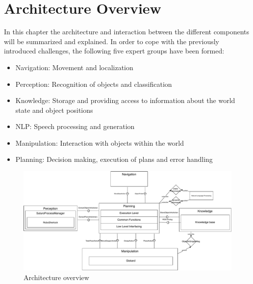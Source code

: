 \documentclass[main.tex]{subfiles}
\begin{document}
	\begingroup

	\renewcommand{\cleardoublepage}{}

	\renewcommand{\clearpage}{}
	
	\newpage

	\chapter{Architecture Overview}
		In this chapter the architecture and interaction between the different components will be summarized and explained.
		In order to cope with the previously introduced challenges, the following five expert groups have been formed:

		\begin{itemize}
			\item Navigation: Movement and localization
			\item Perception: Recognition of objects and classification
			\item Knowledge: Storage and providing access to information about the world state and object positions
			\item NLP: Speech processing and generation
			\item Manipulation: Interaction with objects within the world
			\item Planning: Decision making, execution of plans and error handling
		\end{itemize}
		
			\begin{rotatepage}
				\begin{figure}[H]
					\centering
					\includegraphics[width=1.5\linewidth, angle=90]{pictures/diagramms/overview.pdf}
					\caption{Architecture overview}
					\label{architecture}
				\end{figure}
			\end{rotatepage}
		
\end{document}
